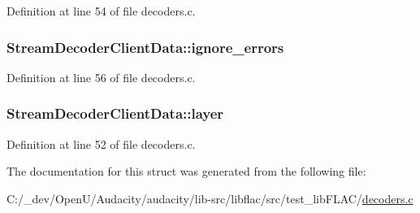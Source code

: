 Definition at line 54 of file decoders.\+c.

\subsubsection[{\texorpdfstring{ignore\+\_\+errors}{ignore_errors}}]{ Stream\+Decoder\+Client\+Data\+::ignore\+\_\+errors}\hypertarget{struct_stream_decoder_client_data_a6d4f7d982690583973f5300f7053d419}{}\label{struct_stream_decoder_client_data_a6d4f7d982690583973f5300f7053d419}


Definition at line 56 of file decoders.\+c.

\subsubsection[{\texorpdfstring{layer}{layer}}]{ Stream\+Decoder\+Client\+Data\+::layer}\hypertarget{struct_stream_decoder_client_data_af6c5ac1bde00cccdc5a178310c47de89}{}\label{struct_stream_decoder_client_data_af6c5ac1bde00cccdc5a178310c47de89}


Definition at line 52 of file decoders.\+c.



The documentation for this struct was generated from the following file\+:\begin{DoxyCompactItemize}
\item 
C\+:/\+\_\+dev/\+Open\+U/\+Audacity/audacity/lib-\/src/libflac/src/test\+\_\+lib\+F\+L\+A\+C/\hyperlink{decoders_8c}{decoders.\+c}\end{DoxyCompactItemize}
